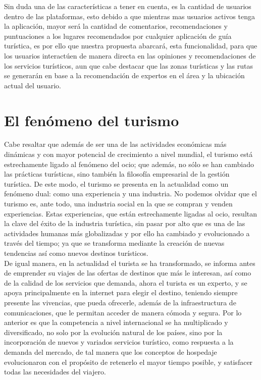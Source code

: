 Sin duda una de las características a tener en cuenta, es la cantidad de usuarios dentro de las plataformas, esto debido a que mientras mas usuarios activos tenga la aplicación, mayor será la cantidad de comentarios, recomendaciones y puntuaciones a los lugares recomendados por cualquier aplicación de guía turística, es por ello que nuestra propuesta abarcará, esta funcionalidad, para que los usuarios interactúen de manera directa en las opiniones y recomendaciones de los servicios turísticos, aun que cabe destacar que las zonas turísticas y las rutas se generarán en base a la recomendación de expertos en el área y la ubicación actual del usuario. \\

\section{El fenómeno del turismo}

Cabe resaltar que además de ser una de las actividades económicas más dinámicas y con mayor potencial de crecimiento a nivel mundial, el turismo está estrechamente ligado al fenómeno del ocio; que además, no sólo se han cambiado las prácticas turísticas, sino también la filosofía empresarial de la gestión turística. De este modo, el turismo se presenta en la actualidad como un fenómeno dual: como una experiencia y una industria. No podemos olvidar que el turismo es, ante todo, una industria social en la que se compran y venden experiencias. Estas experiencias, que están estrechamente ligadas al ocio, resultan la clave del éxito de la industria turística, sin pasar por alto que es una de las actividades humanas más globalizadas y por ello ha cambiado y evolucionado a través del tiempo; ya que se transforma mediante la creación de nuevas tendencias así como nuevos destinos turísticos.\\

De igual manera, en la actualidad el turista se ha transformado, se informa antes de emprender su viajes de las ofertas de destinos que más le interesan, así como de la calidad de los servicios que demanda, ahora el turista es un experto, y se apoya principalmente en la internet para elegir el destino, teniendo siempre presente las vivencias, que pueda ofrecerle, además de la infraestructura de comunicaciones, que le permitan acceder de manera cómoda y segura. Por lo anterior es que la competencia a nivel internacional se ha multiplicado y diversificado, no solo por la evolución natural de los países, sino por la incorporación de nuevos y variados servicios turístico, como respuesta a la demanda del mercado, de tal manera que los conceptos de hospedaje evolucionaron con el propósito de retenerlo el mayor tiempo posible, y satisfacer todas las necesidades del viajero.